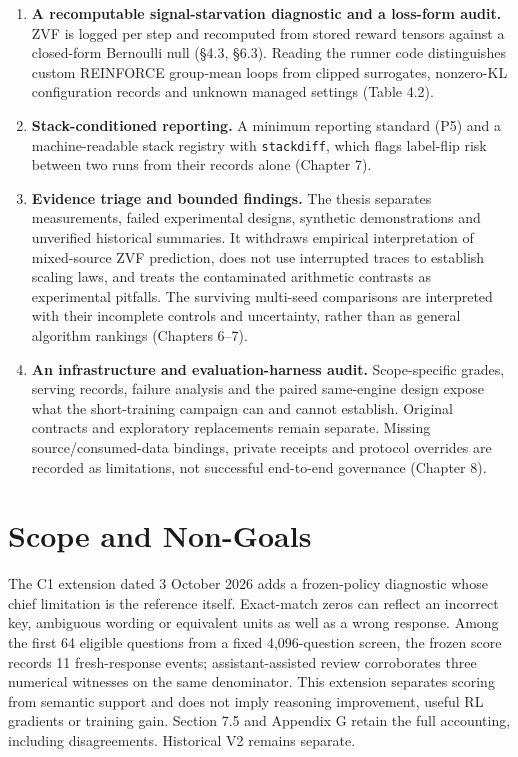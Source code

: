 \documentclass[12pt,a4paper]{report}
\begin{document}
\begin{enumerate}
\def\labelenumi{\arabic{enumi}.}
\item
  \textbf{A recomputable signal-starvation diagnostic and a loss-form
  audit.} ZVF is logged per step and recomputed from stored reward
  tensors against a closed-form Bernoulli null (§4.3, §6.3). Reading the
  runner code distinguishes custom REINFORCE group-mean loops from
  clipped surrogates, nonzero-KL configuration records and unknown
  managed settings (Table 4.2).
\item
  \textbf{Stack-conditioned reporting.} A minimum reporting standard
  (P5) and a machine-readable stack registry with \texttt{stackdiff},
  which flags label-flip risk between two runs from their records alone
  (Chapter 7).
\item
  \textbf{Evidence triage and bounded findings.} The thesis separates
  measurements, failed experimental designs, synthetic demonstrations
  and unverified historical summaries. It withdraws empirical
  interpretation of mixed-source ZVF prediction, does not use
  interrupted traces to establish scaling laws, and treats the
  contaminated arithmetic contrasts as experimental pitfalls. The
  surviving multi-seed comparisons are interpreted with their incomplete
  controls and uncertainty, rather than as general algorithm rankings
  (Chapters 6--7).
\item
  \textbf{An infrastructure and evaluation-harness audit.}
  Scope-specific grades, serving records, failure analysis and the
  paired same-engine design expose what the short-training campaign can
  and cannot establish. Original contracts and exploratory replacements
  remain separate. Missing source/consumed-data bindings, private
  receipts and protocol overrides are recorded as limitations, not
  successful end-to-end governance (Chapter 8).
\end{enumerate}

\section{Scope and Non-Goals}\label{scope-and-non-goals}

The C1 extension dated 3 October 2026 adds a frozen-policy diagnostic
whose chief limitation is the reference itself. Exact-match zeros can
reflect an incorrect key, ambiguous wording or equivalent units as well
as a wrong response. Among the first 64 eligible questions from a fixed
4,096-question screen, the frozen score records 11 fresh-response
events; assistant-assisted review corroborates three numerical witnesses
on the same denominator. This extension separates scoring from semantic
support and does not imply reasoning improvement, useful RL gradients or
training gain. Section 7.5 and Appendix G retain the full accounting,
including disagreements. Historical V2 remains separate.
\end{document}
